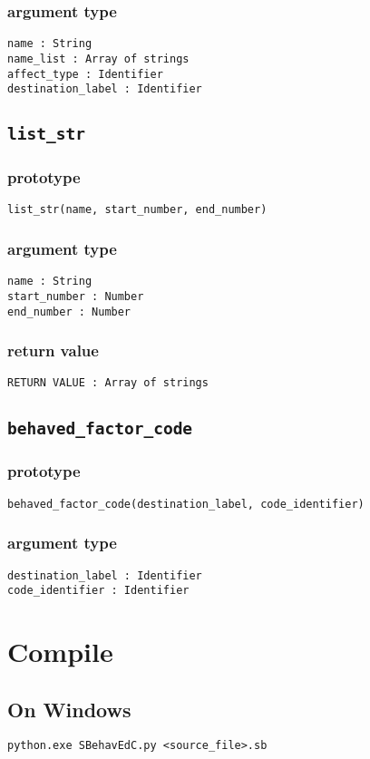 \documentclass{article}
\begin{document}
\subsubsection*{argument type}
\texttt{name : String}\\
\texttt{name_list : Array of strings}\\
\texttt{affect_type : Identifier}\\
\texttt{destination_label : Identifier}

\subsection{\texttt{list_str}}
\subsubsection*{prototype}
\begin{lstlisting}
list_str(name, start_number, end_number)
\end{lstlisting}
\subsubsection*{argument type}
\texttt{name : String}\\
\texttt{start_number : Number}\\
\texttt{end_number : Number}
\subsubsection*{return value}
\texttt{RETURN VALUE : Array of strings}

\subsection{\texttt{behaved_factor_code}}
\subsubsection*{prototype}
\begin{lstlisting}
behaved_factor_code(destination_label, code_identifier)
\end{lstlisting}
\subsubsection*{argument type}
\texttt{destination_label : Identifier}\\
\texttt{code_identifier : Identifier}


\newpage
\section{Compile}
\subsection{On Windows}
\texttt{python.exe SBehavEdC.py <source_file>.sb}
\end{document}
